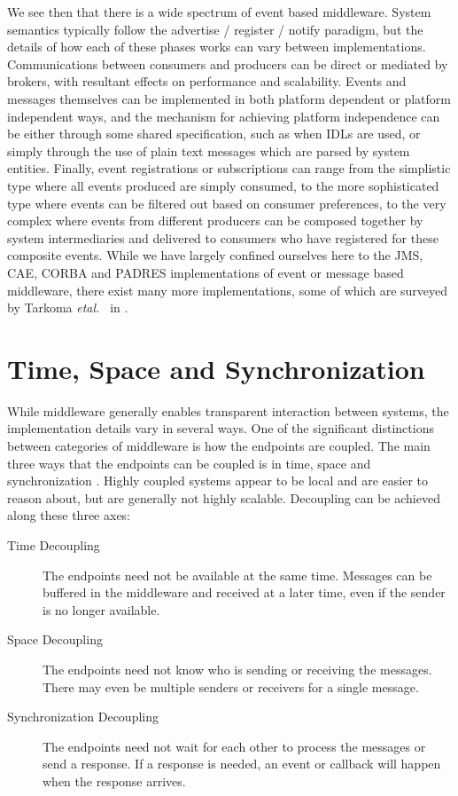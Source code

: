 \documentclass{acm_proc_article-sp}
\begin{document}
We see then that there is a wide spectrum of event based middleware. System semantics typically follow the advertise / register / notify paradigm, but the details of how each of these phases works can vary between implementations. Communications between consumers and producers can be direct or mediated by brokers, with resultant effects on performance and scalability. Events and messages themselves can be implemented in both platform dependent or platform independent ways, and the mechanism for achieving platform independence can be either through some shared specification, such as when IDLs are used, or simply through the use of plain text messages which are parsed by system entities. Finally, event registrations or subscriptions can range from the simplistic type where all events produced are simply consumed, to the more sophisticated type where events can be filtered out based on consumer preferences, to the very complex where events from different producers can be composed together by system intermediaries and delivered to consumers who have registered for these composite events. While we have largely confined ourselves here to the JMS, CAE, CORBA and PADRES implementations of event or message based middleware, there exist many more implementations, some of which are surveyed by Tarkoma {\it etal.\ } in \cite{Tarkoma:2006p6862}.



\section{Time, Space and Synchronization}
\label{sec:timespace}

While middleware generally enables transparent interaction between systems, the implementation details vary in several ways. One of the significant distinctions between categories of middleware is how the endpoints are coupled. The main three ways that the endpoints can be coupled is in time, space and synchronization \cite{Eugster:2003p6725}. Highly coupled systems appear to be local and are easier to reason about, but are generally not highly scalable. Decoupling can be achieved along these three axes:

\begin{description}
\item[Time Decoupling] The endpoints need not be available at the same time. Messages can be buffered in the middleware and received at a later time, even if the sender is no longer available.
\item[Space Decoupling] The endpoints need not know who is sending or receiving the messages. There may even be multiple senders or receivers for a single message.
\item[Synchronization Decoupling] The endpoints need not wait for each other to process the messages or send a response. If a response is needed, an event or callback will happen when the response arrives.
\end{description}
\end{document}
